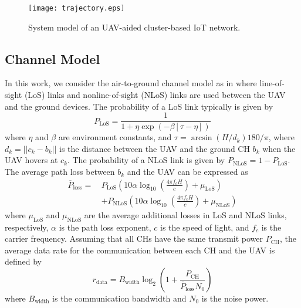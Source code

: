 \documentclass[journal]{IEEEtran}
\begin{document}
	\begin{figure}[t!]
		\centering
		\texttt{[image: trajectory.eps]}
		\caption{System model of an UAV-aided cluster-based IoT network.}
		\label{trajectory}
	\end{figure}

    \subsection{Channel Model}
     In this work, we consider the air-to-ground channel model as in \cite{J. Yao and N. Ansari} where line-of-sight (LoS) links and nonline-of-sight (NLoS) links are used between the UAV and the ground devices. The probability of a LoS link typically is given by
     \begin{equation}
	    P_{\text{LoS}} = \frac{1}{1+\eta\exp{\left(-\beta[\tau-\eta]\right)}}
	\end{equation}
	where $\eta$ and $\beta$ are environment constants, and $\tau=  \arcsin{(H/d_{k})}180/\pi$, where $d_k = ||c_k-b_k||$ is the distance between the UAV and the ground CH $b_k$ when the UAV hovers at $c_k$.
	The probability of a NLoS link is given by $P_{\text{NLoS}} = 1-P_{\text{LoS}}$.
	The average path loss between $b_k$ and the UAV can be expressed as \cite{J. Yao and N. Ansari}
	\begin{align}
	    \overline{P}_{\text{loss}} = \,& P_{\text{LoS}} \left(10\alpha \log_{10}\left(\frac{4\pi f_c H}{c}\right) + \mu_{\text{LoS}} \right) \nonumber \\
	    & + P_{\text{NLoS}}\left(10\alpha \log_{10}\left(\frac{4\pi f_c H}{c}\right) + \mu_{\text{NLoS}} \right)
	\end{align}
	where $\mu_{\text{LoS}}$ and $\mu_{\text{NLoS}}$ are the average additional losses in LoS and NLoS links, respectively, $\alpha$ is the path loss exponent, $c$ is the speed of light, and $f_c$ is the carrier frequency. Assuming that all CHs have the same transmit power $P_{\text{CH}}$, the average data rate for the communication between each CH and the UAV is defined by \cite{J. Yao and N. Ansari}
	\begin{equation}
	    r_{\text{data}} = B_{\text{width}}\log_2\left(1+\frac{P_{\text{CH}}}{\overline{P}_{\text{loss}}N_{0}}\right)
	\end{equation}
	where $ B_{\text{width}}$ is the communication bandwidth and $N_0$ is the noise power.
	
\end{document}
